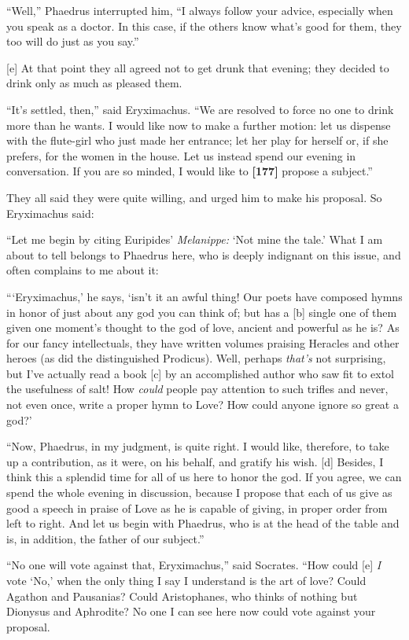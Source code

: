 “Well,” Phaedrus interrupted him, “I always follow your advice,
especially when you speak as a doctor. In this case, if the others know
what's good for them, they too will do just as you say.”

{[}e{]} At that point they all agreed not to get drunk that evening;
they decided to drink only as much as pleased them.

“It's settled, then,” said Eryximachus. “We are resolved to force no one
to drink more than he wants. I would like now to make a further motion:
let us dispense with the flute-girl who just made her entrance; let her
play for herself or, if she prefers, for the women in the house. Let us
instead spend our evening in conversation. If you are so minded, I would
like to {\bf {[}177{]}} propose a subject.”

They all said they were quite willing, and urged him to make his
proposal. So Eryximachus said:

“Let me begin by citing Euripides' {\em Melanippe:} ‘Not mine the tale.'
What I am about to tell belongs to Phaedrus here, who is deeply
indignant on this issue, and often complains to me about it:

“‘Eryximachus,' he says, ‘isn't it an awful thing! Our poets have
composed hymns in honor of just about any god you can think of; but has
a {[}b{]} single one of them given one moment's thought to the god of
love, ancient and powerful as he is? As for our fancy intellectuals,
they have written volumes praising Heracles and other heroes (as did the
distinguished Prodicus). Well, perhaps {\em that's} not surprising, but
I've actually read a book {[}c{]} by an accomplished author who saw fit
to extol the usefulness of salt! How {\em could} people pay attention to
such trifles and never, not even once, write a proper hymn to Love? How
could anyone ignore so great a god?'

“Now, Phaedrus, in my judgment, is quite right. I would like, therefore,
to take up a contribution, as it were, on his behalf, and gratify his
wish. {[}d{]} Besides, I think this a splendid time for all of us here
to honor the god. If you agree, we can spend the whole evening in
discussion, because I propose that each of us give as good a speech in
praise of Love as he is capable of giving, in proper order from left to
right. And let us begin with Phaedrus, who is at the head of the table
and is, in addition, the father of our subject.”

“No one will vote against that, Eryximachus,” said Socrates. “How could
{[}e{]} {\em I} vote ‘No,' when the only thing I say I understand is the
art of love? Could Agathon and Pausanias? Could Aristophanes, who thinks
of nothing but Dionysus and Aphrodite? No one I can see here now could
vote against your proposal.

